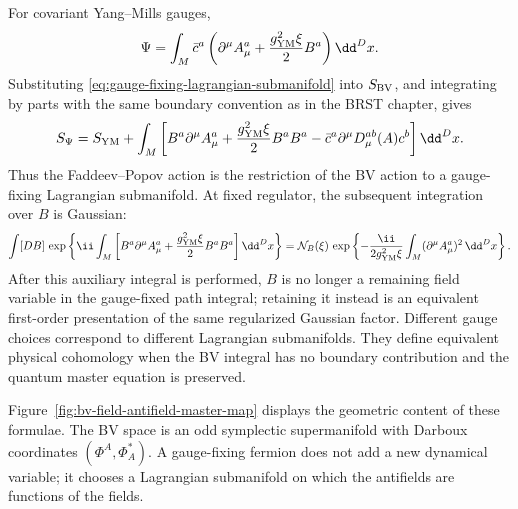 For covariant Yang--Mills gauges,
\[
  \Psi
  =
  \int_M
  \bar c^a\left(
  \partial^\mu A_\mu^a+\frac{g_{\rm YM}^2\xi}{2}B^a
  \right)\dd^D x .
\]
Substituting \eqref{eq:gauge-fixing-lagrangian-submanifold} into
\(S_{\rm BV}\), and integrating by parts with the same boundary convention as
in the BRST chapter, gives
\[
  S_\Psi
  =
  S_{\rm YM}
  +
  \int_M
  \left[
  B^a\partial^\mu A_\mu^a
  +
  \frac{g_{\rm YM}^2\xi}{2}B^aB^a
  -
  \bar c^a\partial^\mu D_\mu^{ab}(A)c^b
  \right]\dd^D x .
\]
Thus the Faddeev--Popov action is the restriction of the BV action to a
gauge-fixing Lagrangian submanifold.  At fixed regulator, the subsequent
integration over \(B\) is Gaussian:
\[
  \int[DB]\,
  \exp\left\{
  \ii\int_M
  \left[
  B^a\partial^\mu A_\mu^a
  +
  \frac{g_{\rm YM}^2\xi}{2}B^aB^a
  \right]\dd^D x
  \right\}
  =
  \mathcal N_B(\xi)\,
  \exp\left\{
  -\frac{\ii}{2g_{\rm YM}^2\xi}
  \int_M(\partial^\mu A_\mu^a)^2\,\dd^D x
  \right\}.
\]
After this auxiliary integral is performed, \(B\) is no longer a remaining
field variable in the gauge-fixed path integral; retaining it instead is an
equivalent first-order presentation of the same regularized Gaussian factor.
Different gauge choices correspond to different Lagrangian submanifolds.  They
define equivalent physical cohomology when the BV integral has no boundary
contribution and the quantum master equation is preserved.

Figure~\ref{fig:bv-field-antifield-master-map} displays the geometric
content of these formulae.  The BV space is an odd symplectic supermanifold
with Darboux coordinates \((\Phi^A,\Phi^*_A)\).  A gauge-fixing fermion does
not add a new dynamical variable; it chooses a Lagrangian submanifold on which
the antifields are functions of the fields.

